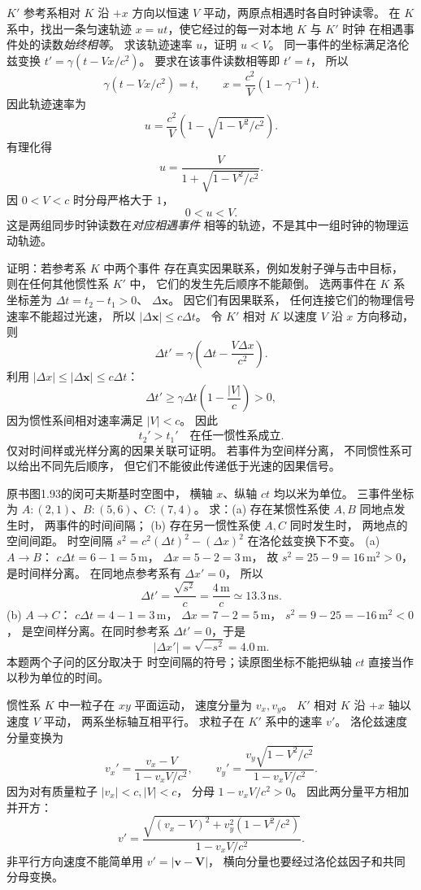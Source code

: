 $K'$ 参考系相对 $K$ 沿 $+x$ 方向以恒速
$V$ 平动，两原点相遇时各自时钟读零。
在 $K$ 系中，找出一条匀速轨迹
$x=ut$，使它经过的每一对本地 $K$ 与 $K'$ 时钟
在相遇事件处的读数\emph{始终相等}。
求该轨迹速率 $u$，证明 $u<V$。
\exsolution
同一事件的坐标满足洛伦兹变换
$t'=\gamma(t-Vx/c^2)$。
要求在该事件读数相等即 $t'=t$，
所以
\[
\gamma(t-Vx/c^2)=t,
\qquad
x=\frac{c^2}{V}(1-\gamma^{-1})t.
\]
因此轨迹速率为
\[
\boxed{u=\frac{c^2}{V}
\left(1-\sqrt{1-V^2/c^2}\right)}.
\]
有理化得
\[
u=\frac{V}{1+\sqrt{1-V^2/c^2}}.
\]
因 $0<V<c$ 时分母严格大于 $1$，
\[
\boxed{0<u<V}.
\]
\excheck 这是两组同步时钟读数在\emph{对应相遇事件}
相等的轨迹，不是其中一组时钟的物理运动轨迹。

证明：若参考系 $K$ 中两个事件
存在真实因果联系，例如发射子弹与击中目标，
则在任何其他惯性系 $K'$ 中，
它们的发生先后顺序不能颠倒。
\exsolution
选两事件在 $K$ 系坐标差为
$\Delta t=t_2-t_1>0$、
$\Delta\bm x$。
因它们有因果联系，
任何连接它们的物理信号速率不能超过光速，
所以
$|\Delta\bm x|\le c\Delta t$。
令 $K'$ 相对 $K$ 以速度 $V$ 沿 $x$ 方向移动，
则
\[
\Delta t'=\gamma\left(
\Delta t-\frac{V\Delta x}{c^2}\right).
\]
利用 $|\Delta x|\le|\Delta\bm x|\le c\Delta t$：
\[
\Delta t'\ge
\gamma\Delta t\left(1-\frac{|V|}{c}\right)>0,
\]
因为惯性系间相对速率满足 $|V|<c$。
因此
\[
\boxed{t_2'>t_1'\quad\text{在任一惯性系成立}}.
\]
\excheck 仅对时间样或光样分离的因果关联可证明。
若事件为空间样分离，
不同惯性系可以给出不同先后顺序，
但它们不能彼此传递低于光速的因果信号。

原书图1.93的闵可夫斯基时空图中，
横轴 $x$、纵轴 $ct$ 均以米为单位。
三事件坐标为
$A:(2,1)$、$B:(5,6)$、$C:(7,4)$。
求：(a) 存在某惯性系使 $A,B$ 同地点发生时，
两事件的时间间隔；
(b) 存在另一惯性系使 $A,C$ 同时发生时，
两地点的空间间距。
\exsolution
时空间隔
$s^2=c^2(\Delta t)^2-(\Delta x)^2$
在洛伦兹变换下不变。
(a) $A\to B$：
$c\Delta t=6-1=5\,\mathrm m$，
$\Delta x=5-2=3\,\mathrm m$，
故 $s^2=25-9=16\,\mathrm{m^2}>0$，
是时间样分离。
在同地点参考系有 $\Delta x'=0$，
所以
\[
\boxed{\Delta t'=\frac{\sqrt{s^2}}{c}
=\frac{4\,\mathrm m}{c}
\simeq13.3\,\mathrm{ns}}.
\]
(b) $A\to C$：
$c\Delta t=4-1=3\,\mathrm m$，
$\Delta x=7-2=5\,\mathrm m$，
$s^2=9-25=-16\,\mathrm{m^2}<0$，
是空间样分离。在同时参考系
$\Delta t'=0$，于是
\[
\boxed{|\Delta x'|=\sqrt{-s^2}=4.0\,\mathrm m}.
\]
\excheck 本题两个子问的区分取决于
时空间隔的符号；读原图坐标不能把纵轴 $ct$
直接当作以秒为单位的时间。

惯性系 $K$ 中一粒子在 $xy$ 平面运动，
速度分量为 $v_x,v_y$。
$K'$ 相对 $K$ 沿 $+x$ 轴以速度 $V$ 平动，
两系坐标轴互相平行。
求粒子在 $K'$ 系中的速率 $v'$。
\exsolution
洛伦兹速度分量变换为
\[
v_x'=\frac{v_x-V}{1-v_xV/c^2},
\qquad
v_y'=\frac{v_y\sqrt{1-V^2/c^2}}{1-v_xV/c^2}.
\]
因为对有质量粒子
$|v_x|<c,|V|<c$，
分母 $1-v_xV/c^2>0$。
因此两分量平方相加并开方：
\[
\boxed{v'=\frac{
\sqrt{(v_x-V)^2+v_y^2(1-V^2/c^2)}
}{1-v_xV/c^2}}.
\]
\excheck 非平行方向速度不能简单用
$v'=|\bm v-\bm V|$，
横向分量也要经过洛伦兹因子和共同分母变换。

